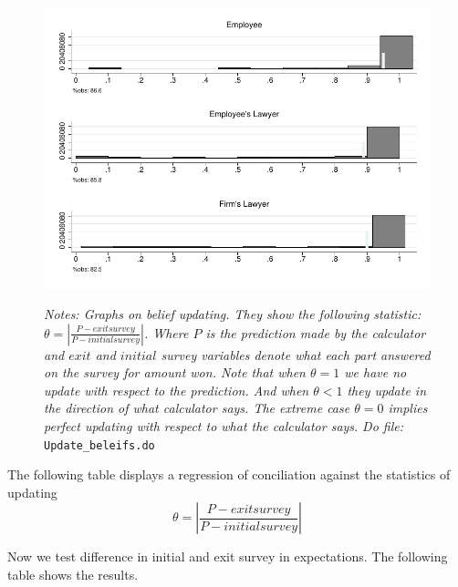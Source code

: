 \documentclass[12pt]{article}
\theoremstyle{named}
\newcommand{\folder}{./Effect}
\begin{document}
\pagebreak


\begin{figure}[H]
\label{update}
\begin{center}
\includegraphics[width=\textwidth]{./Figures/updatebeleif_amount.pdf}
\end{center}
{\footnotesize \textit{Notes: Graphs on belief updating. They show the following statistic: $\theta=\left|\frac{P-exitsurvey}{P-initialsurvey}\right|$. Where $P$ is the prediction made by the calculator and $exit$ and $initial$ survey variables denote what each part answered on the survey for amount won. Note that when $\theta=1$ we have no update with respect to the prediction. And when $\theta<1$ they update in the direction of what calculator says. The extreme case $\theta=0$ implies perfect updating with respect to what the calculator says. }}
{\footnotesize \textit{Do file: } \texttt{Update\_beleifs.do}}
\end{figure}


\pagebreak

The following table displays a regression of conciliation against the statistics of updating
\[\theta=\left|\frac{P-exitsurvey}{P-initialsurvey}\right|\]

\begin{center}
\scriptsize{}
\end{center}


\pagebreak


Now we test difference in initial and exit survey in expectations. The following table shows the results.

\begin{center}
\scriptsize{}
\end{center}
\end{document}
